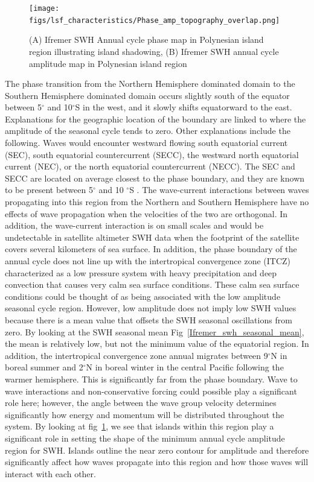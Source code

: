 \documentclass[draft,linenumbers]{agujournal2018}
\begin{document}
\begin{figure}[htb]
\centering
\texttt{[image: figs/lsf\_characteristics/Phase\_amp\_topography\_overlap.png]}
\caption{(A) Ifremer SWH Annual cycle phase map in Polynesian island region illustrating island shadowing, (B) Ifremer SWH annual cycle amplitude map in Polynesian island region }
\label{phase_amp_topo_comp}
\end{figure}

The phase transition from the Northern Hemisphere dominated domain to the Southern Hemisphere dominated domain occurs slightly south of the equator between 5$^{\circ}$ and 10$^{\circ}$S in the west, and it slowly shifts equatorward to the east. Explanations for the geographic location of the boundary are linked to where the amplitude of the seasonal cycle tends to zero. Other explanations include the following. Waves would encounter westward flowing south equatorial current (SEC), south equatorial countercurrent (SECC), the westward north equatorial current (NEC), or the north equatorial countercurrent (NECC). The SEC and SECC are located on average closest to the phase boundary, and they are known to be present between 5$^{\circ}$ and 10 $^{\circ}$S \cite{talley2011descriptive}. The wave-current interactions between waves propagating into this region from the Northern and Southern Hemisphere have no effects of wave propagation when the velocities of the two are orthogonal. In addition, the wave-current interaction is on small scales and would be undetectable in satellite altimeter SWH data when the footprint of the satellite covers several kilometers of sea surface. In addition, the phase boundary of the annual cycle does not line up with the intertropical convergence zone (ITCZ) characterized as a low pressure system with heavy precipitation and deep convection that causes very calm sea surface conditions. These calm sea surface conditions could be thought of as being associated with the low amplitude seasonal cycle region. However, low amplitude does not imply low SWH values because there is a mean value that offsets the SWH seasonal oscillations from zero. By looking at the SWH seasonal mean Fig~\ref{Ifremer_swh_seasonal_mean}, the mean is relatively low, but not the minimum value of the equatorial region. In addition, the intertropical  convergence zone annual migrates between 9$^{\circ}$N in boreal summer and 2$^{\circ}$N in boreal winter in the central Pacific following the warmer hemisphere. This is significantly far from the phase boundary. Wave to wave interactions and non-conservative forcing could possible play a significant role here; however, the angle between the wave group velocity determines significantly how energy and momentum will be distributed throughout the system. By looking at fig~\ref{phase_amp_topo_comp}, we see that islands within this region play a significant role in setting the shape of the minimum annual cycle amplitude region for SWH. Islands outline the near zero contour for amplitude and therefore significantly affect how waves propagate into this region and how those waves will interact with each other. 
\end{document}
